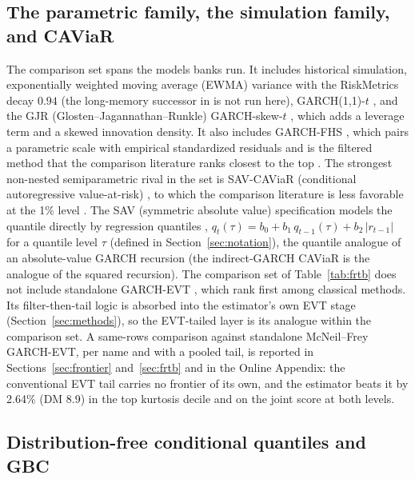 \documentclass[11pt]{article}
\theoremstyle{remark}
\begin{document}
\subsection{The parametric family, the simulation family, and CAViaR}

The comparison set spans the models banks run. It includes historical simulation, exponentially weighted moving average (EWMA) variance with the RiskMetrics decay $0.94$ \citep{riskmetrics1996} (the long-memory successor in \citealp{zumbach2007} is not run here), GARCH(1,1)-$t$ \citep{bollerslev1986, bollerslev1987}, and the GJR (Glosten--Jagannathan--Runkle) GARCH-skew-$t$ \citep{glosten1993, hansen1994ARCD}, which adds a leverage term and a skewed innovation density. It also includes GARCH-FHS \citep{baroneadesi1999fhs, hullwhite1998}, which pairs a parametric scale with empirical standardized residuals and is the filtered method that the comparison literature ranks closest to the top \citep{kuester2006, nietoruiz2016}. The strongest non-nested semiparametric rival in the set is SAV-CAViaR (conditional autoregressive value-at-risk) \citep{engle2004caviar}, to which the comparison literature is less favorable at the 1\% level \citep{kuester2006}.
The SAV (symmetric absolute value) specification models the quantile
directly by regression quantiles \citep{koenker1978},
$q_t(\tau) = b_0 + b_1\, q_{t-1}(\tau) + b_2\,|r_{t-1}|$ for a quantile level $\tau$ (defined in Section~\ref{sec:notation}), the
quantile analogue of an absolute-value GARCH recursion (the indirect-GARCH CAViaR is the analogue of the squared recursion).
The comparison set of Table~\ref{tab:frtb} does not include standalone GARCH-EVT \citep{mcneilfrey2000}, which
\citet{kuester2006} rank first among classical methods. Its
filter-then-tail logic is absorbed into the estimator's own EVT
stage (Section~\ref{sec:methods}), so the EVT-tailed layer is its
analogue within the comparison set. A same-rows comparison against standalone McNeil--Frey GARCH-EVT, per name and with a pooled tail, is reported in Sections~\ref{sec:frontier} and~\ref{sec:frtb} and in the Online Appendix: the conventional EVT tail carries no frontier of its own, and the estimator beats it by 2.64\% (DM 8.9) in the top kurtosis decile and on the joint score at both levels.

\subsection{Distribution-free conditional quantiles and GBC}
\end{document}
